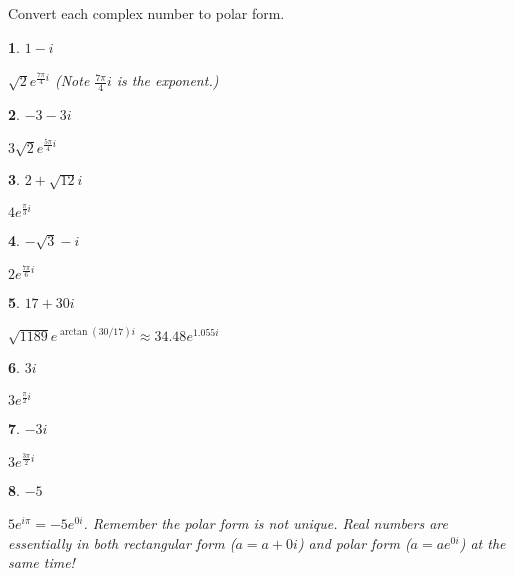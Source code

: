 \documentclass{amsbook}
\newtheorem{exc}{}
\newenvironment{ex}{\begin{exc}\normalfont}{\end{exc}}
\numberwithin{section}{chapter}
\numberwithin{equation}{chapter}
\newcommand{\ds}{\displaystyle}
\begin{document}
Convert each complex number to polar form.

\begin{multicols}{2}

\begin{ex}
	$1-i$
	\begin{sol}
	$\ds \sqrt{2}e^{\frac{7\pi}{4}i}$ (Note $\frac{7\pi}{4}i$ is the exponent.)
	\end{sol}
\end{ex}

\begin{ex}
	$-3-3i$
	\begin{sol}
		$\ds 3\sqrt{2}e^{\frac{5\pi}{4}i}$
	\end{sol}
\end{ex}


\begin{ex}
	$2+\sqrt{12}i$
	\begin{sol}
		$\ds 4e^{\frac{\pi}{3}i}$
	\end{sol}
\end{ex}


\begin{ex}
	$-\sqrt{3}-i$
	\begin{sol}
		$\ds 2e^{\frac{7\pi}{6}i}$
	\end{sol}
\end{ex}

\begin{ex}
	$17+30i$
	\begin{sol}
		$\ds \sqrt{1189} e^{\arctan(30/17)i} \approx 34.48e^{1.055i}$
	\end{sol}
\end{ex}

\begin{ex}
	$3i$
	\begin{sol}
		$\ds 3e^{\frac{\pi}{2}i}$
	\end{sol}
\end{ex}


\begin{ex}
	$-3i$
	\begin{sol}
		$\ds 3e^{\frac{3\pi}{2}i}$
	\end{sol}
\end{ex}


\begin{ex}
	$-5$
	\begin{sol}
		$\ds 5e^{i\pi} = -5e^{0i}$. Remember the polar form is not unique. Real numbers are essentially in both rectangular form ($a = a+0i$) and polar form ($a = ae^{0i}$) at the same time!
	\end{sol}
\end{ex}

\end{multicols}
\end{document}
